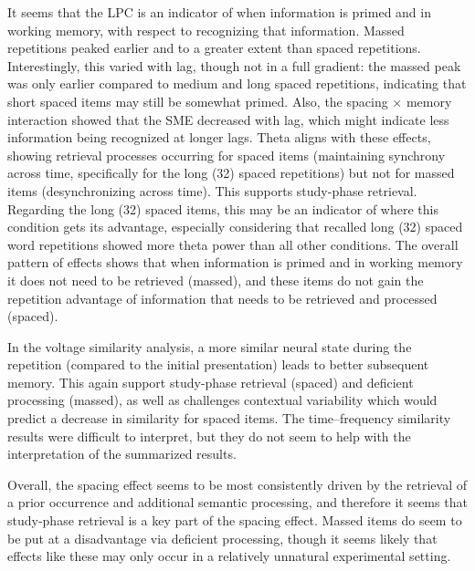 It seems that the LPC is an indicator of when information is primed and in working memory, with respect to recognizing that information.  Massed repetitions peaked earlier and to a greater extent than spaced repetitions.  Interestingly, this varied with lag, though not in a full gradient: the massed peak was only earlier compared to medium and long spaced repetitions, indicating that short spaced items may still be somewhat primed.  Also, the spacing $\times$ memory interaction showed that the SME decreased with lag, which might indicate less information being recognized at longer lags.
Theta aligns with these effects, showing retrieval processes occurring for spaced items (maintaining synchrony across time, specifically for the long (32) spaced repetitions) but not for massed items (desynchronizing across time).  This supports study-phase retrieval.  Regarding the long (32) spaced items, this may be an indicator of where this condition gets its advantage, especially considering that recalled long (32) spaced word repetitions showed more theta power than all other conditions.
The overall pattern of effects shows that when information is primed and in working memory it does not need to be retrieved (massed), and these items do not gain the repetition advantage of information that needs to be retrieved and processed (spaced).


In the voltage similarity analysis, a more similar neural state during the repetition (compared to the initial presentation) leads to better subsequent memory.  This again support study-phase retrieval (spaced) and deficient processing (massed), as well as challenges contextual variability which would predict a decrease in similarity for spaced items.  The time--frequency similarity results were difficult to interpret, but they do not seem to help with the interpretation of the summarized results.

Overall, the spacing effect seems to be most consistently driven by the retrieval of a prior occurrence and additional semantic processing, and therefore it seems that study-phase retrieval is a key part of the spacing effect.  Massed items do seem to be put at a disadvantage via deficient processing, though it seems likely that effects like these may only occur in a relatively unnatural experimental setting.






